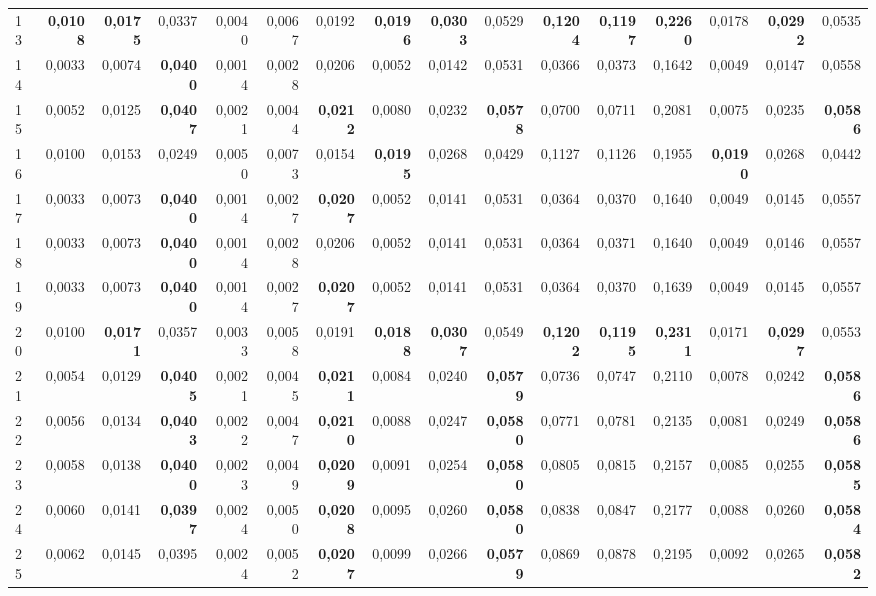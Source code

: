 \begin{table}[htp!]
\begin{adjustwidth}{-2cm}{}
\begin{tabular}{ l | *{15}{| r}}
13	&	\textbf{0,0108}	&	\textbf{0,0175}	&	0,0337	&	0,0040	&	0,0067	&	0,0192	&	\textbf{0,0196}	&	\textbf{0,0303}	&	0,0529	&	\textbf{0,1204}	&	\textbf{0,1197}	&	\textbf{0,2260}	&	0,0178	&	\textbf{0,0292}	&	0,0535	\\
14	&	0,0033	&	0,0074	&	\textbf{0,0400}	&	0,0014	&	0,0028	&	0,0206	&	0,0052	&	0,0142	&	0,0531	&	0,0366	&	0,0373	&	0,1642	&	0,0049	&	0,0147	&	0,0558	\\
15	&	0,0052	&	0,0125	&	\textbf{0,0407}	&	0,0021	&	0,0044	&	\textbf{0,0212}	&	0,0080	&	0,0232	&	\textbf{0,0578}	&	0,0700	&	0,0711	&	0,2081	&	0,0075	&	0,0235	&	\textbf{0,0586}	\\
16	&	0,0100	&	0,0153	&	0,0249	&	0,0050	&	0,0073	&	0,0154	&	\textbf{0,0195}	&	0,0268	&	0,0429	&	0,1127	&	0,1126	&	0,1955	&	\textbf{0,0190}	&	0,0268	&	0,0442	\\
17	&	0,0033	&	0,0073	&	\textbf{0,0400}	&	0,0014	&	0,0027	&	\textbf{0,0207}	&	0,0052	&	0,0141	&	0,0531	&	0,0364	&	0,0370	&	0,1640	&	0,0049	&	0,0145	&	0,0557	\\
18	&	0,0033	&	0,0073	&	\textbf{0,0400}	&	0,0014	&	0,0028	&	0,0206	&	0,0052	&	0,0141	&	0,0531	&	0,0364	&	0,0371	&	0,1640	&	0,0049	&	0,0146	&	0,0557	\\
19	&	0,0033	&	0,0073	&	\textbf{0,0400}	&	0,0014	&	0,0027	&	\textbf{0,0207}	&	0,0052	&	0,0141	&	0,0531	&	0,0364	&	0,0370	&	0,1639	&	0,0049	&	0,0145	&	0,0557	\\
20	&	0,0100	&	\textbf{0,0171}	&	0,0357	&	0,0033	&	0,0058	&	0,0191	&	\textbf{0,0188}	&	\textbf{0,0307}	&	0,0549	&	\textbf{0,1202}	&	\textbf{0,1195}	&	\textbf{0,2311}	&	0,0171	&	\textbf{0,0297}	&	0,0553	\\
21	&	0,0054	&	0,0129	&	\textbf{0,0405}	&	0,0021	&	0,0045	&	\textbf{0,0211}	&	0,0084	&	0,0240	&	\textbf{0,0579}	&	0,0736	&	0,0747	&	0,2110	&	0,0078	&	0,0242	&	\textbf{0,0586}	\\
22	&	0,0056	&	0,0134	&	\textbf{0,0403}	&	0,0022	&	0,0047	&	\textbf{0,0210}	&	0,0088	&	0,0247	&	\textbf{0,0580}	&	0,0771	&	0,0781	&	0,2135	&	0,0081	&	0,0249	&	\textbf{0,0586}	\\
23	&	0,0058	&	0,0138	&	\textbf{0,0400}	&	0,0023	&	0,0049	&	\textbf{0,0209}	&	0,0091	&	0,0254	&	\textbf{0,0580}	&	0,0805	&	0,0815	&	0,2157	&	0,0085	&	0,0255	&	\textbf{0,0585}	\\
24	&	0,0060	&	0,0141	&	\textbf{0,0397}	&	0,0024	&	0,0050	&	\textbf{0,0208}	&	0,0095	&	0,0260	&	\textbf{0,0580}	&	0,0838	&	0,0847	&	0,2177	&	0,0088	&	0,0260	&	\textbf{0,0584}	\\
25	&	0,0062	&	0,0145	&	0,0395	&	0,0024	&	0,0052	&	\textbf{0,0207}	&	0,0099	&	0,0266	&	\textbf{0,0579}	&	0,0869	&	0,0878	&	0,2195	&	0,0092	&	0,0265	&	\textbf{0,0582}	\\

\end{tabular}
\end{adjustwidth}
\end{table}
